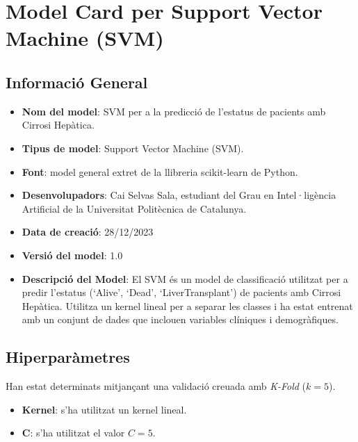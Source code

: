 \section{Model Card per Support Vector Machine (SVM)}

\subsection{Informació General}
\begin{itemize}

\item \textbf{Nom del model}: SVM per a la predicció de l'estatus de pacients amb Cirrosi Hepàtica.
\item \textbf{Tipus de model}: Support Vector Machine (SVM).
\item \textbf{Font}: model general extret de la llibreria scikit-learn de Python.
\item \textbf{Desenvolupadors}: Cai Selvas Sala, estudiant del Grau en Intel·ligència Artificial de la Universitat Politècnica de Catalunya.
\item \textbf{Data de creació}: 28/12/2023
\item \textbf{Versió del model}: 1.0
\item \textbf{Descripció del Model}: El SVM és un model de classificació utilitzat per a predir l'estatus (`Alive', `Dead', `LiverTransplant') de pacients amb Cirrosi Hepàtica. Utilitza un kernel lineal per a separar les classes i ha estat entrenat amb un conjunt de dades que inclouen variables clíniques i demogràfiques.
\end{itemize}

\subsection{Hiperparàmetres}
Han estat determinats mitjançant una validació creuada amb \textit{K-Fold} ($k = 5$).
\begin{itemize}
	\item \textbf{Kernel}: s'ha utilitzat un kernel lineal.
	\item \textbf{C}: s'ha utilitzat el valor $C = 5$. 
\end{itemize}

